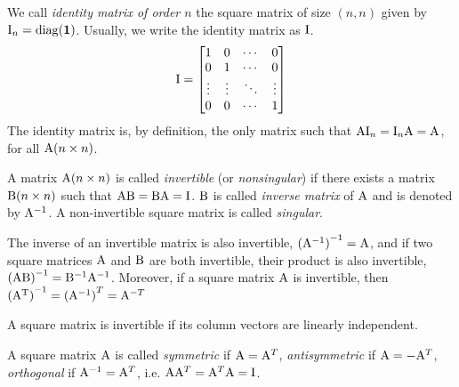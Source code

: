 \begin{definition}
    We call \textit{identity matrix of order $n$} the square matrix of size $(n, n)$ given by $\mathrm{I}_n = \mathrm{diag}(\mathbf{1})$. Usually,  we write the identity matrix as $\mathrm{I}$.
    $$
        \mathrm{I} = \left[\begin{matrix}
        1 & 0 & \cdots & 0 \\
        0 & 1 & \cdots & 0 \\
        \vdots & \vdots & \ddots & \vdots \\
        0 & 0 & \cdots & 1
        \end{matrix}\right]
    $$
    The identity matrix is, by definition, the only matrix such that $\mathrm{A}\mathrm{I}_n = \mathrm{I}_n\mathrm{A} = \mathrm{A}$, for all $\mathrm{A}(n \times n)$.
\end{definition}

\begin{definition}
    A matrix $\mathrm{A}(n \times n)$ is called \textit{invertible} (or \textit{nonsingular}) if there exists a matrix $\mathrm{B}(n \times n)$ such that $\mathrm{A}\mathrm{B} = \mathrm{B}\mathrm{A} = \mathrm{I}$. $\mathrm{B}$ is called \textit{inverse matrix} of $\mathrm{A}$ and is denoted by $\mathrm{A}^{-1}$. A non-invertible square matrix is called \textit{singular}.
    
    The inverse of an invertible matrix is also invertible, $\mathrm{(\mathrm{A}^{-1})}^{-1} = \mathrm{A}$, and if two square matrices $\mathrm{A}$ and $\mathrm{B}$ are both invertible, their product is also invertible, $\mathrm{(AB)}^{-1} = \mathrm{B}^{-1}\mathrm{A}^{-1}$. Moreover, if a square matrix $\mathrm{A}$ is invertible, then $\mathrm{(\mathrm{A}^T)}^{-1} = \mathrm{(\mathrm{A}^{-1})}^T = \mathrm{A}^{-T}$
\end{definition}

\begin{proposition}
    A square matrix is invertible if its column vectors are linearly independent.
\end{proposition}



\begin{definition}
    A square matrix $\mathrm{A}$ is called \textit{symmetric} if $\mathrm{A} = \mathrm{A}^T$, \textit{antisymmetric} if $\mathrm{A} = -\mathrm{A}^T$, \textit{orthogonal} if $\mathrm{A}^{-1} = \mathrm{A}^T$, i.e. $\mathrm{A}\mathrm{A}^T = \mathrm{A}^T\mathrm{A} = \mathrm{I}$.
\end{definition}



